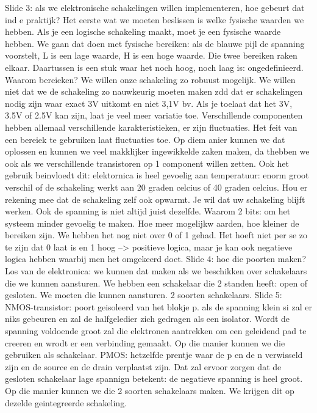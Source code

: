 \documentclass[10pt,a4paper]{book}
\begin{document}
Slide 3: als we elektronische schakelingen willen implementeren, hoe gebeurt dat ind e praktijk? Het eerste wat we moeten beslissen is welke fysische waarden we hebben. Als je een logische schakeling maakt, moet je een fysische waarde hebben. We gaan dat doen met fysische bereiken: als de blauwe pijl de spanning voorstelt, L is een lage waarde, H is een hoge waarde. Die twee bereiken raken elkaar. Daartussen is een stuk waar het noch hoog, noch laag is: ongedefinieerd.
Waarom bereieken? We willen onze schakeling zo robuust mogelijk. We willen niet dat we de schakeling zo nauwkeurig moeten maken zdd dat er schakelingen nodig zijn waar exact 3V uitkomt en niet 3,1V bv. Als je toelaat dat het 3V, 3.5V of 2.5V kan zijn, laat je veel meer variatie toe. Verschillende componenten hebben allemaal verschillende karakteristieken, er zijn fluctuaties. Het feit van een bereiek te gebruiken laat fluctuaties toe. Op diem anier kunnen we dat oplossen en kunnen we veel makklijker ingewikkelde zaken maken, da thebben we ook als we verschillende transistoren op 1 component willen zetten.
Ook het gebruik beinvloedt dit: elektornica is heel gevoelig aan temperatuur: enorm groot verschil of de schakeling werkt aan 20 graden celcius of 40 graden celcius. Hou er rekening mee dat de schakeling zelf ook opwarmt. Je wil dat uw schakeling blijft werken. 
Ook de spanning is niet altijd juist dezelfde.
Waarom 2 bits: om het systeem minder gevoelig te maken. Hoe meer mogelijkw aarden, hoe kleiner de bereiken zijn.
We hebben het nog niet over 0 of 1 gehad. Het hoeft niet per se zo te zijn dat 0 laat is en 1 hoog --> positieve logica, maar je kan ook negatieve logica hebben waarbij men het omgekeerd doet. 
Slide 4: hoe die poorten maken? Los van de elektronica: we kunnen dat maken als we beschikken over schakelaars die we kunnen aansturen. We hebben een schakelaar die 2 standen heeft: open of gesloten. We moeten die kunnen aansturen. 2 soorten schakelaars.
Slide 5: NMOS-transistor: poort geisoleerd van het blokje p. als de spanning klein si zal er niks gebeuren en zal de halfgeledier zich gedragen als een isolator. Wordt de spanning voldoende groot zal die elektronen aantrekken om een geleidend pad te creeren en wrodt er een verbinding gemaakt. Op die manier kunnen we die gebruiken als schakelaar.
PMOS: hetzelfde prentje waar de p en de n verwisseld zijn en de source en de drain verplaatst zijn. Dat zal ervoor zorgen dat de gesloten schakelaar lage spannign betekent: de negatieve spanning is heel groot. 
Op die manier kunnen we die 2 soorten schakelaars maken. We krijgen dit op dezelde geintegreerde schakeling.
\end{document}
